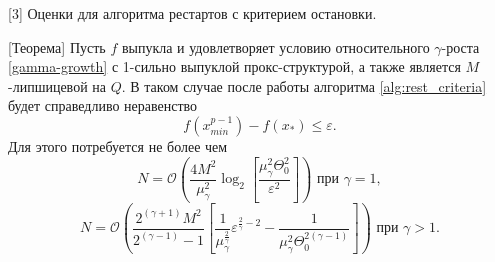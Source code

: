 \begin{frame} {[3] Оценки для алгоритма рестартов с критерием остановки.}
\begin{block}{[Теорема]} \label{simple_restart}
    Пусть $f$ выпукла и удовлетворяет условию относительного $\gamma$-роста \eqref{gamma-growth} с 1-сильно выпуклой прокс-структурой, а также является $M$-липшицевой на $Q$. В таком случае после работы алгоритма \ref{alg:rest_criteria} будет справедливо неравенство
    \begin{equation}
        f(x_{min}^{p-1}) - f(x_*) \leq \varepsilon.
    \end{equation}
    Для этого потребуется не более чем
    \begin{equation}
       N = \mathcal{O} \left( \frac{4 M^2}{\mu_{\gamma}^2} \log_2{\left[\frac{\mu_{\gamma}^2 \Theta_0^2}{\varepsilon^2} \right]} \right) \text{ при } \gamma = 1,
    \end{equation}
    \begin{equation}
       N = \mathcal{O}\left( \frac{2^{(\gamma + 1)} M^2 }{2^{(\gamma - 1)} - 1}\left[ \frac{1}{\mu_{\gamma}^{\frac{2}{\gamma}}} \varepsilon^{\frac{2}{\gamma} - 2} - \frac{1}{\mu_{\gamma}^2 \Theta_0^{2(\gamma - 1)}} \right] \right) \text{ при } \gamma > 1.
    \end{equation}
\end{block}
\end{frame}

